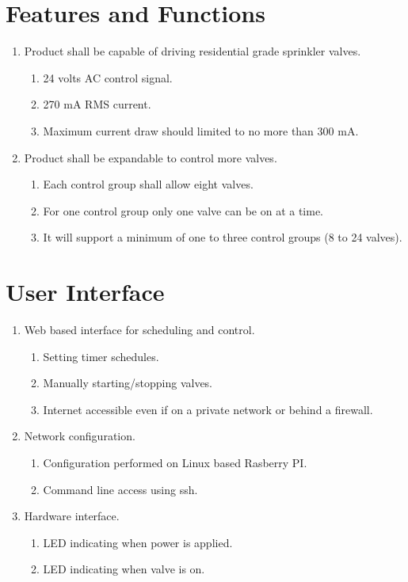 \documentclass[12pt,letterpaper]{article}
\begin{document}

\pagebreak

\section{Features and Functions}

\begin{enumerate}
\item Product shall be capable of driving residential grade sprinkler valves.
	\begin{enumerate}
	\item 24 volts AC control signal.
	\item 270 mA RMS current.
	\item Maximum current draw should limited to no more than 300 mA.
	\end{enumerate}

\item Product shall be expandable to control more valves.
	\begin{enumerate}
	\item Each control group shall allow eight valves.
	\item For one control group only one valve can be on at a time.
	\item It will support a minimum of one to three control groups
		(8 to 24 valves).
	\end{enumerate}
\end{enumerate}

\section{User Interface}

\begin{enumerate}
\item Web based interface for scheduling and control.
	\begin{enumerate}
	\item Setting timer schedules.
	\item Manually starting/stopping valves.
	\item Internet accessible even if on a private network or behind a firewall.
	\end{enumerate}
\item Network configuration.
	\begin{enumerate}
	\item Configuration performed on Linux based Rasberry PI.
	\item Command line access using ssh.
	\end{enumerate}
\item Hardware interface.
	\begin{enumerate}
	\item LED indicating when power is applied.
	\item LED indicating when valve is on.
	\end{enumerate}
\end{enumerate}
\end{document}

